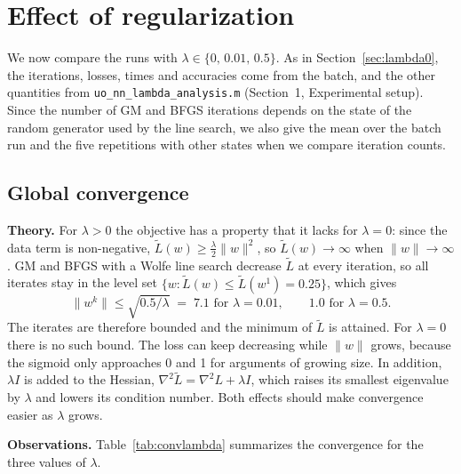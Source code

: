 
\section{Effect of regularization}\label{sec:lambdapos}

We now compare the runs with $\lambda\in\{0,\,0.01,\,0.5\}$. As in Section~\ref{sec:lambda0}, the iterations, losses, times and accuracies come from the batch, and the other quantities from \texttt{uo\_nn\_\allowbreak lambda\_\allowbreak analysis.m} (Section~1, Experimental setup). Since the number of GM and BFGS iterations depends on the state of the random generator used by the line search, we also give the mean over the batch run and the five repetitions with other states when we compare iteration counts.

\subsection{Global convergence}\label{sec:lambdaglobal}

\textbf{Theory.} For $\lambda>0$ the objective has a property that it lacks for $\lambda=0$: since the data term is non-negative, $\tilde L(w)\ge\frac{\lambda}{2}\|w\|^2$, so $\tilde L(w)\to\infty$ when $\|w\|\to\infty$. GM and BFGS with a Wolfe line search decrease $\tilde L$ at every iteration, so all iterates stay in the level set $\{w:\tilde L(w)\le\tilde L(w^1)=0.25\}$, which gives
\[
  \|w^k\|\le\sqrt{0.5/\lambda}\;=\;7.1 \text{ for } \lambda=0.01,\qquad 1.0 \text{ for } \lambda=0.5 .
\]
The iterates are therefore bounded and the minimum of $\tilde L$ is attained. For $\lambda=0$ there is no such bound. The loss can keep decreasing while $\|w\|$ grows, because the sigmoid only approaches 0 and 1 for arguments of growing size. In addition, $\lambda I$ is added to the Hessian, $\nabla^2\tilde L=\nabla^2 L+\lambda I$, which raises its smallest eigenvalue by $\lambda$ and lowers its condition number. Both effects should make convergence easier as $\lambda$ grows.

\textbf{Observations.} Table~\ref{tab:convlambda} summarizes the convergence for the three values of $\lambda$.

